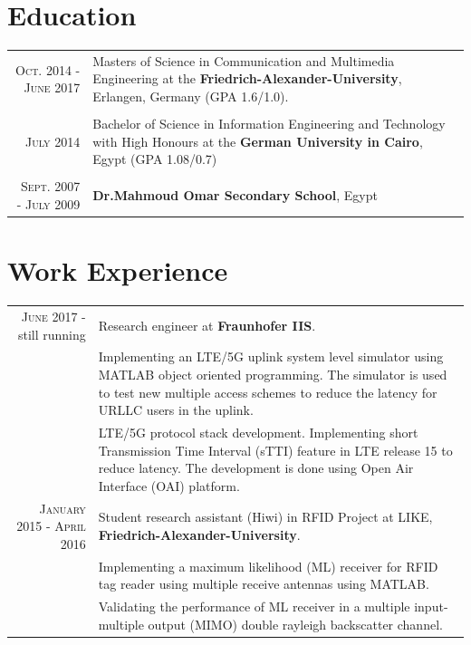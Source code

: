 \documentclass[a4paper,10pt]{article}
\begin{document}
\section{Education}
\begin{tabular}{r|p{9cm}}	
\textsc{Oct.} 2014 - \textsc{June} 2017 & Masters of Science in Communication and Multimedia Engineering at the {\bf Friedrich-Alexander-University}, Erlangen, Germany (GPA 1.6/1.0). \\
& \\

 \textsc{July} 2014 & Bachelor of Science in Information Engineering and Technology with High Honours at the {\bf German University in Cairo}, Egypt (GPA 1.08/0.7)\\
& \\
 \textsc{Sept.} 2007 - \textsc{July} 2009 & {\bf Dr.Mahmoud Omar Secondary School}, Egypt
\end{tabular}

\section{Work Experience}
\begin{tabular}{r|p{9cm}}
	\textsc{June} 2017 - still running & Research engineer at {\bf Fraunhofer IIS}.\\
	& Implementing an LTE/5G uplink system level simulator using MATLAB object oriented programming. The simulator is used to test new multiple access schemes to reduce the latency for URLLC users in the uplink.\\
	& LTE/5G protocol stack development. Implementing short Transmission Time Interval (sTTI) feature in LTE release 15 to reduce latency. The development is done using Open Air Interface (OAI) platform. \\
	\textsc{January} 2015 - \textsc{April} 2016 & Student research assistant (Hiwi) in RFID Project at LIKE, {\bf Friedrich-Alexander-University}.\\
	& Implementing a maximum likelihood (ML) receiver for RFID tag reader using multiple receive antennas using MATLAB. \\
	& Validating the performance of ML receiver in a multiple input-multiple output (MIMO) double rayleigh backscatter channel. \\ 
\end{tabular}

\end{document}
